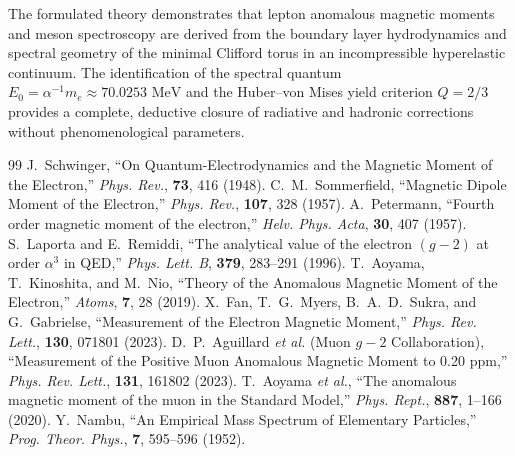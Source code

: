 \documentclass[12pt,a4paper]{article}
\begin{document}
	The formulated theory demonstrates that lepton anomalous magnetic moments and meson spectroscopy are derived from the boundary layer hydrodynamics and spectral geometry of the minimal Clifford torus in an incompressible hyperelastic continuum. The identification of the spectral quantum $E_0 = \alpha^{-1} m_e \approx 70.0253\text{ MeV}$ and the Huber--von Mises yield criterion $Q = 2/3$ provides a complete, deductive closure of radiative and hadronic corrections without phenomenological parameters.
	
	\begin{thebibliography}{99}
		 J.~Schwinger, ``On Quantum-Electrodynamics and the Magnetic Moment of the Electron,'' \textit{Phys. Rev.}, \textbf{73}, 416 (1948).
		 C.~M.~Sommerfield, ``Magnetic Dipole Moment of the Electron,'' \textit{Phys. Rev.}, \textbf{107}, 328 (1957).
		 A.~Petermann, ``Fourth order magnetic moment of the electron,'' \textit{Helv. Phys. Acta}, \textbf{30}, 407 (1957).
		 S.~Laporta and E.~Remiddi, ``The analytical value of the electron $(g-2)$ at order $\alpha^3$ in QED,'' \textit{Phys. Lett. B}, \textbf{379}, 283--291 (1996).
		 T.~Aoyama, T.~Kinoshita, and M.~Nio, ``Theory of the Anomalous Magnetic Moment of the Electron,'' \textit{Atoms}, \textbf{7}, 28 (2019).
		 X.~Fan, T.~G.~Myers, B.~A.~D.~Sukra, and G.~Gabrielse, ``Measurement of the Electron Magnetic Moment,'' \textit{Phys. Rev. Lett.}, \textbf{130}, 071801 (2023).
		 D.~P.~Aguillard \textit{et al.} (Muon $g-2$ Collaboration), ``Measurement of the Positive Muon Anomalous Magnetic Moment to 0.20 ppm,'' \textit{Phys. Rev. Lett.}, \textbf{131}, 161802 (2023).
		 T.~Aoyama \textit{et al.}, ``The anomalous magnetic moment of the muon in the Standard Model,'' \textit{Phys. Rept.}, \textbf{887}, 1--166 (2020).
		 Y.~Nambu, ``An Empirical Mass Spectrum of Elementary Particles,'' \textit{Prog. Theor. Phys.}, \textbf{7}, 595--596 (1952).
	\end{thebibliography}
	
\end{document}
